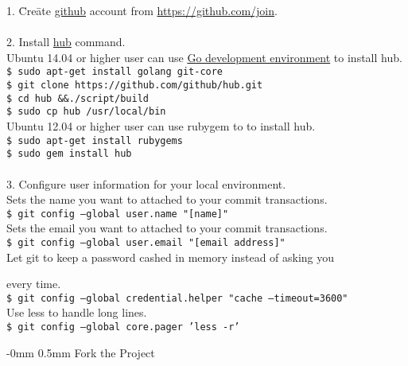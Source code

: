 \documentclass[10pt,landscape]{article}
\makeatletter
\renewcommand{\section}{\@startsection{section}{1}{0mm}%
                                {-0mm} %
                                {0.5mm}%
                                {\normalfont\large\bfseries}}
\makeatother
\begin{document}
\begin{multicols}{2}
\begin{tabbing}
1. \= Cre\=ate \href{http://github.com}{github} account from
\href{https://github.com/join}{https://github.com/join}.\\
\\
2. Install \href{https://github.com/github/hub}{hub} command.\\
\> Ubuntu 14.04 or higher user can use \href{http://golang.org/doc/install}{Go development
  environment} to install hub.\\
\>\> \texttt{\$ sudo apt-get install golang git-core}\\
\>\> \texttt{\$ git clone https://github.com/github/hub.git}\\
\>\> \texttt{\$ cd hub \&\&./script/build}\\
\>\> \texttt{\$ sudo cp hub /usr/local/bin}\\
\> Ubuntu 12.04 or higher user can use rubygem to to install hub.\\
\>\> \texttt{\$ sudo apt-get install rubygems}\\
\>\> \texttt{\$ sudo gem install hub}\\
\\
3. Configure user information for your local environment.\\
\> Sets the name you want to attached to your commit transactions.\\
\>\> \texttt{\$ git config --global user.name "[name]"}\\
\>Sets the email you want to attached to your commit transactions.\\
\>\> \texttt{\$ git config --global user.email "[email address]"}\\
\>Let git to keep a password cashed in memory instead of asking you

every time.\\
\>\> \texttt{\$ git config --global credential.helper "cache --timeout=3600"}\\
\>Use less to handle long lines.\\
\>\> \texttt{\$ git config --global core.pager 'less -r'}\\

\end{tabbing}

\vspace{-2.5mm}
\section{Fork the Project}
\vspace{0.5mm}


\end{multicols}
\end{document}
